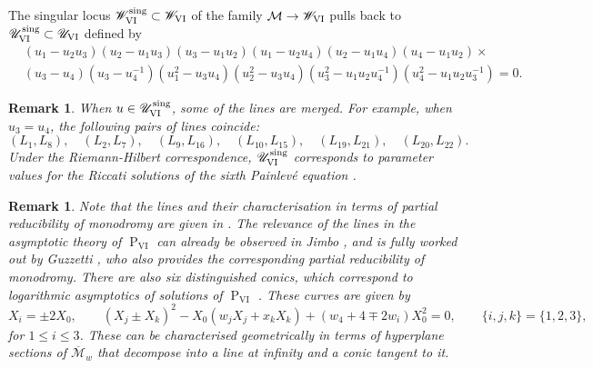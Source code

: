 \documentclass[a4paper,reqno]{amsart}
\numberwithin{equation}{section}
\newcommand{\pain}[1]{\operatorname{P}_{\mathrm{#1}}}
\newtheorem{remark}[theorem]{Remark}
\numberwithin{equation}{section}
\begin{document}
The singular locus $\mathscr{W}_{\rm{VI}}^{\operatorname{sing}}\subset \mathscr{W}_{\rm{VI}}$ of the family $\mathcal{M}\to \mathscr{W}_{\rm{VI}}$ pulls back to $\mathscr{U}_{\rm{VI}}^{\operatorname{sing}}\subset \mathscr{U}_{\rm{VI}}$  defined by 
\begin{equation*}
\begin{aligned}
    &\left(u_1- u_2 u_3\right)
    \left(u_2- u_1 u_3\right) 
    \left(u_3- u_1 u_2\right) 
    \left(u_1- u_2 u_4\right)
    \left(u_2- u_1 u_4\right) 
    \left(u_4- u_1 u_2\right) \times \\ 
   &\left(u_3-u_4\right) 
    \left(u_3 -u_4^{-1}\right) 
     \left(u_1^2-u_3 u_4\right) 
    \left(u_2^2-u_3 u_4\right)    
    \left(u_3^2 -u_1 u_2u_4^{-1}\right) 
    \left( u_4^2-u_1 u_2u_3^{-1}\right)=0.
\end{aligned}
\end{equation*}

\begin{remark}
    When $u\in \mathscr{U}_{\rm{VI}}^{\operatorname{sing}}$, some of the lines are merged. 
For example, when $u_3=u_4$, the following pairs of lines coincide: 
\begin{equation*}
    (L_1,L_8), \quad (L_2,L_7), \quad (L_9,L_{16}),\quad (L_{10},L_{15}),\quad (L_{19},L_{21}),\quad (L_{20},L_{22}).
\end{equation*}
Under the Riemann-Hilbert correspondence, $\mathscr{U}_{\rm{VI}}^{\operatorname{sing}}$ corresponds to parameter values for the Riccati solutions of the sixth Painlev\'e equation \cite{inabadynamics}. 
\end{remark}

\begin{remark} \label{rem:linesmonodromyPVI}
    Note that the lines and their characterisation in terms of partial reducibility of monodromy are given in \cites{mklimes2024,ORS}. 
    The relevance of the lines in the asymptotic theory of $\pain{VI}$ can already be observed in Jimbo \cite{jimbo1982}, and is fully worked out by Guzzetti \cites{guzzetti2006,guzzetti12}, who also provides the corresponding partial reducibility of monodromy. 
    There are also six distinguished conics, which correspond to logarithmic asymptotics of solutions of $\pain{VI}$ \cite{guzzetti2008loga}.
    These curves are given by 
    $$X_i=\pm 2X_0, \qquad (X_j\pm X_k)^2 - X_0(w_j X_j+x_kX_k) + (w_4+4 \mp 2w_i)X_0^2=0,\qquad \{i,j,k\}=\{1,2,3\}, $$
 for $1\leq i\leq 3$.
    These can be characterised geometrically in terms of hyperplane sections of $\overline{\mathcal{M}}_w$ that decompose into a line at infinity and a conic tangent to it.
\end{remark}
\end{document}
